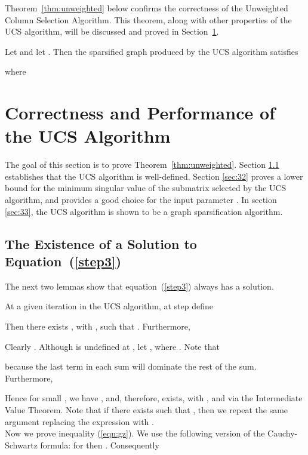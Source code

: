 \documentclass[final,leqno,onefignum,onetabnum]{siamltex1213}
\begin{document}
Theorem~\ref{thm:unweighted} below confirms the correctness of the Unweighted Column Selection Algorithm. This theorem, along with other properties of 
the UCS algorithm, will be discussed and proved in Section~\ref{Sec:Properties}.
\begin{theorem} \label{thm:unweighted}
Let  and let . Then the sparsified graph  produced by 
the UCS algorithm satisfies

where 

\end{theorem}
 


\section{Correctness and Performance of the UCS Algorithm}\label{Sec:Properties}
The goal of this section is to prove Theorem~\ref{thm:unweighted}.  Section \ref{sec:31} establishes that the UCS algorithm is well-defined.  Section \ref{sec:32} proves a lower bound for the minimum singular value of the submatrix selected by the UCS algorithm, and provides a good choice for the input parameter .  In section \ref{sec:33}, the UCS algorithm is shown to be a graph sparsification algorithm.

\subsection{The Existence of a Solution to Equation~(\ref{step3})}\label{sec:31}
The next two lemmas show that equation~(\ref{step3}) always has a solution.
\begin{lemma}\label{lemma:1}
At a given iteration  in the UCS algorithm, at step  define

Then there exists , with , such that .  Furthermore,
\small

\end{lemma}
\normalsize
\proof
Clearly .  Although  is undefined at
, let , where
.  Note that

because the last term in each sum will dominate the rest of the sum.  Furthermore,

Hence for small , we have , and, therefore,  exists, with , and  via the Intermediate Value Theorem.  Note that if there exists  such that , then we repeat the same argument replacing the expression  with .\\

Now we prove inequality (\ref{eqn:gz}).  We use the following version of the Cauchy-Schwartz formula: for  then . Consequently
\end{document}
